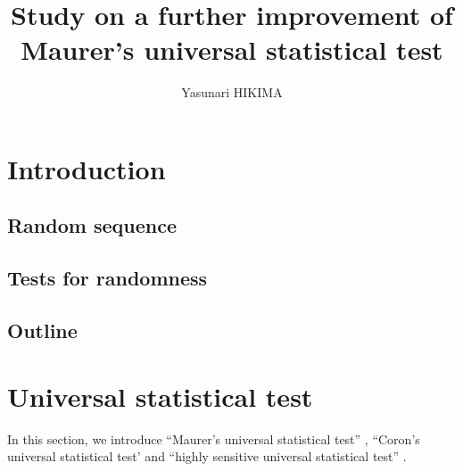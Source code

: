 \documentclass[dvipdfmx,english]{ampmt} %
\title[Study on a further improvement of \\ Maurer's universal statistical test]
      {Study on a further improvement of \\  Maurer's universal statistical test}
\author{Yasunari HIKIMA}
\begin{document}
\ifoutputbody
\makeinsidecover                %
\makeabstract                   %
\maketoc                        %
\setcounter{page}{1}
\section{Introduction}\label{sec:introduction}
\subsection{Random sequence}%

\subsection{Tests for randomness}\label{subsec:1-2}%

\subsection{Outline}%

\newpage
\section{Universal statistical test}\label{sec:universal}
In this section, we introduce ``Maurer's universal statistical test'' \cite{maurer1992universal}, ``Coron's universal statistical test' \cite{coron1999security} and ``highly sensitive universal statistical test'' \cite{yamamoto2016highly}.
%

\newpage
\end{document}
